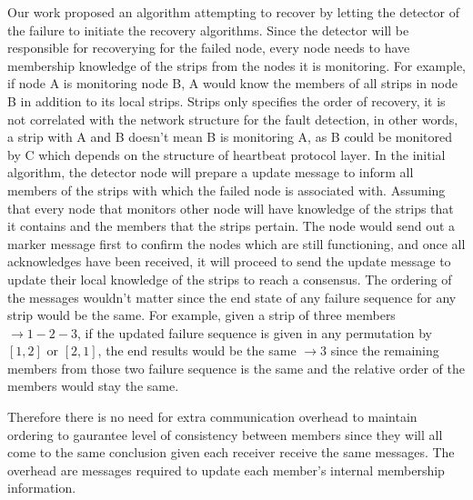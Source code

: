 Our work proposed an algorithm attempting to recover by letting the
detector of the failure to initiate the recovery algorithms.
Since the detector will be responsible for recoverying for the failed node,
every node needs to have membership knowledge of the strips from the nodes it
is monitoring. For example, if node A is monitoring node B, A would know the
members of all strips in node B in addition to its local strips. Strips only
specifies the order of recovery, it is not correlated with the network
structure for the fault detection, in other words, a strip with A and B doesn't
mean B is monitoring A, as B could be monitored by C which depends on the
structure of heartbeat protocol layer.
In the initial algorithm, the detector node will prepare a update message to
inform all members of the strips with which the failed node is associated with.
Assuming that every node that monitors other node will have knowledge of the
strips that it contains and the members that the strips pertain. The node would
send out a marker message first to confirm the nodes which are still
functioning, and once all acknowledges have been received, it will proceed to
send the update message to update their local knowledge of the strips to reach
a consensus. The ordering of the messages wouldn't matter since the end state
of any failure sequence for any strip would be the same. For example, given
a strip of three members $\rightarrow 1-2-3$, if the updated failure sequence
is given in any permutation by $[1, 2]$ or $[2, 1]$, the end results would be
the same $\rightarrow 3$ since the remaining members from those two failure
sequence is the same and the relative order of the members would stay the same.

Therefore there is no need for extra communication overhead to maintain
ordering to gaurantee level of consistency between members since they will all
come to the same conclusion given each receiver receive the same messages. The
overhead are messages required to update each member's internal membership
information.

